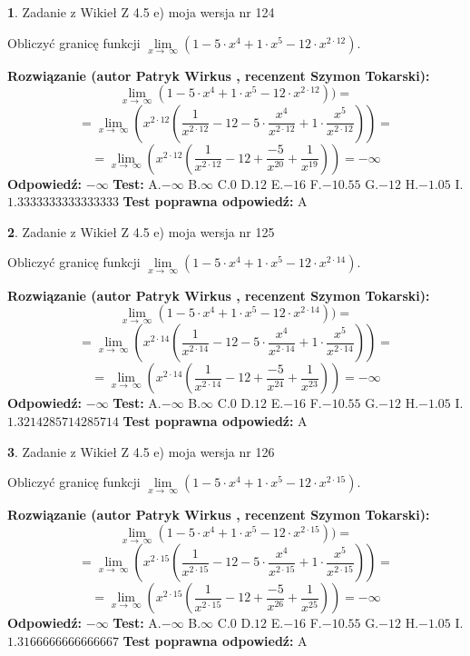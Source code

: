 \documentclass[12pt, a4paper]{article}
\theoremstyle{definition} %
\newtheorem{zad}{}
\newcommand{\zadStart}[1]{\begin{zad}#1\newline}
\newcommand{\zadStop}{\end{zad}}
\newcommand{\rozwStart}[2]{\noindent \textbf{Rozwiązanie (autor #1 , recenzent #2): }\newline}
\newcommand{\rozwStop}{\newline}
\newcommand{\odpStart}{\noindent \textbf{Odpowiedź:}\newline}
\newcommand{\odpStop}{\newline}
\newcommand{\testStart}{\noindent \textbf{Test:}\newline}
\newcommand{\testStop}{\newline}
\newcommand{\kluczStart}{\noindent \textbf{Test poprawna odpowiedź:}\newline}
\newcommand{\kluczStop}{\newline}
\begin{document}
\zadStart{Zadanie z Wikieł Z 4.5 e) moja wersja nr 124}


Obliczyć granicę funkcji  $\lim\limits_{x\to\ \infty}(1 - 5 \cdot x^{4}+1 \cdot x^{5}- 12 \cdot x^{2\cdot12})$.
\zadStop
\rozwStart{Patryk Wirkus}{Szymon Tokarski}
$$\lim\limits_{x\to\ \infty}(1 - 5 \cdot x^{4}+1 \cdot x^{5}- 12 \cdot x^{2\cdot12}))=$$
$$=\lim\limits_{x\to\ \infty}(x^{2\cdot12}(\frac{1}{x^{2\cdot12}}-12 -5 \cdot \frac{x^{4}}{x^{2\cdot12}}+1 \cdot \frac{x^{5}}{x^{2\cdot12}}))=$$
$$=\lim\limits_{x\to\ \infty}(x^{2\cdot12}(\frac{1}{x^{2\cdot12}}-12 + \frac{-5}{x^{20}}+ \frac{1}{x^{19}}))=-\infty$$
\rozwStop
\odpStart
$-\infty$
\odpStop
\testStart
A.$-\infty$ B.$\infty$ C.$0$ D.$12$ E.$-16$
F.$-10.55$ G.$-12$
H.$-1.05$
I.$1.3333333333333333$
\testStop
\kluczStart
A
\kluczStop



\zadStart{Zadanie z Wikieł Z 4.5 e) moja wersja nr 125}


Obliczyć granicę funkcji  $\lim\limits_{x\to\ \infty}(1 - 5 \cdot x^{4}+1 \cdot x^{5}- 12 \cdot x^{2\cdot14})$.
\zadStop
\rozwStart{Patryk Wirkus}{Szymon Tokarski}
$$\lim\limits_{x\to\ \infty}(1 - 5 \cdot x^{4}+1 \cdot x^{5}- 12 \cdot x^{2\cdot14}))=$$
$$=\lim\limits_{x\to\ \infty}(x^{2\cdot14}(\frac{1}{x^{2\cdot14}}-12 -5 \cdot \frac{x^{4}}{x^{2\cdot14}}+1 \cdot \frac{x^{5}}{x^{2\cdot14}}))=$$
$$=\lim\limits_{x\to\ \infty}(x^{2\cdot14}(\frac{1}{x^{2\cdot14}}-12 + \frac{-5}{x^{24}}+ \frac{1}{x^{23}}))=-\infty$$
\rozwStop
\odpStart
$-\infty$
\odpStop
\testStart
A.$-\infty$ B.$\infty$ C.$0$ D.$12$ E.$-16$
F.$-10.55$ G.$-12$
H.$-1.05$
I.$1.3214285714285714$
\testStop
\kluczStart
A
\kluczStop



\zadStart{Zadanie z Wikieł Z 4.5 e) moja wersja nr 126}


Obliczyć granicę funkcji  $\lim\limits_{x\to\ \infty}(1 - 5 \cdot x^{4}+1 \cdot x^{5}- 12 \cdot x^{2\cdot15})$.
\zadStop
\rozwStart{Patryk Wirkus}{Szymon Tokarski}
$$\lim\limits_{x\to\ \infty}(1 - 5 \cdot x^{4}+1 \cdot x^{5}- 12 \cdot x^{2\cdot15}))=$$
$$=\lim\limits_{x\to\ \infty}(x^{2\cdot15}(\frac{1}{x^{2\cdot15}}-12 -5 \cdot \frac{x^{4}}{x^{2\cdot15}}+1 \cdot \frac{x^{5}}{x^{2\cdot15}}))=$$
$$=\lim\limits_{x\to\ \infty}(x^{2\cdot15}(\frac{1}{x^{2\cdot15}}-12 + \frac{-5}{x^{26}}+ \frac{1}{x^{25}}))=-\infty$$
\rozwStop
\odpStart
$-\infty$
\odpStop
\testStart
A.$-\infty$ B.$\infty$ C.$0$ D.$12$ E.$-16$
F.$-10.55$ G.$-12$
H.$-1.05$
I.$1.3166666666666667$
\testStop
\kluczStart
A
\kluczStop
\end{document}
